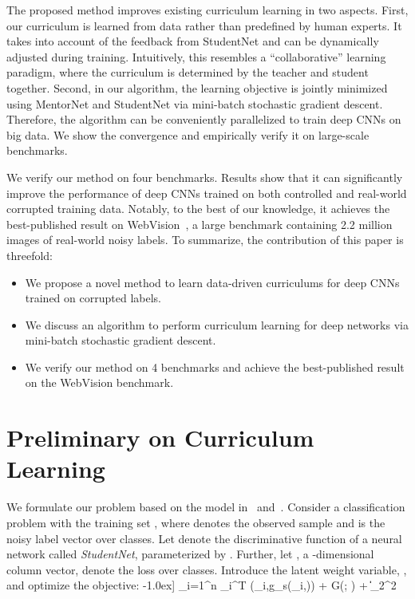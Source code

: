 \documentclass{article}
\begin{document}
The proposed method improves existing curriculum learning in two aspects. First, our curriculum is learned from data rather than predefined by human experts. It takes into account of the feedback from StudentNet and can be dynamically adjusted during training. Intuitively, this resembles a ``collaborative'' learning paradigm, where the curriculum is determined by the teacher and student together. Second, in our algorithm, the learning objective is jointly minimized using MentorNet and StudentNet via mini-batch stochastic gradient descent. Therefore, the algorithm can be conveniently parallelized to train deep CNNs on big data. We show the convergence and empirically verify it on large-scale benchmarks.

We verify our method on four benchmarks. Results show that it can significantly improve the performance of deep CNNs trained on both controlled and real-world corrupted training data. Notably, to the best of our knowledge, it achieves the best-published result on WebVision~\cite{li2017webvision}, a large benchmark containing 2.2 million images of real-world noisy labels. To summarize, the contribution of this paper is threefold:

\begin{itemize}
\vspace{-3mm}
    \item We propose a novel method to learn data-driven curriculums for deep CNNs trained on corrupted labels.
\vspace{-5mm}
    \item We discuss an algorithm to perform curriculum learning for deep networks via mini-batch stochastic gradient descent.
\vspace{-2mm}
    \item We verify our method on 4 benchmarks and achieve the best-published result on the WebVision benchmark.
\vspace{-5mm}
\end{itemize}

\vspace{-5mm}
\section{Preliminary on Curriculum Learning}
We formulate our problem based on the model in~\cite{kumar2010self} and~\cite{jiang2015self}. Consider a classification problem with the training set , where  denotes the  observed sample and  is the noisy label vector over  classes. Let  denote the discriminative function of a neural network called \emph{StudentNet}, parameterized by . Further, let , a -dimensional column vector, denote the loss over  classes. Introduce the latent weight variable, , and optimize the objective:
-1.0ex]
\sum_{i=1}^n _i^T (_i,\!g_s(_i,\!)) + G(; \lambda) + \theta \|\|_2^2
\end{document}
